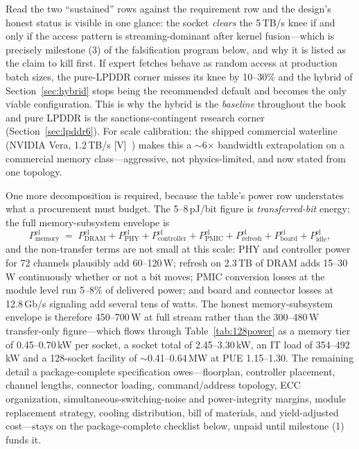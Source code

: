 Read the two ``sustained'' rows against the requirement row and the design's honest status is visible in one glance: the socket \emph{clears} the 5\,TB/s knee if and only if the access pattern is streaming-dominant after kernel fusion---which is precisely milestone (3) of the falsification program below, and why it is listed as the claim to kill first. If expert fetches behave as random access at production batch sizes, the pure-LPDDR corner misses its knee by 10--30\% and the hybrid of Section~\ref{sec:hybrid} stops being the recommended default and becomes the only viable configuration. This is why the hybrid is the \emph{baseline} throughout the book and pure LPDDR is the sanctions-contingent research corner (Section~\ref{sec:lpddr6}). For scale calibration: the shipped commercial waterline (NVIDIA Vera, 1.2\,TB/s [V]~\cite{nvidiaVera}) makes this a $\sim$6$\times$ bandwidth extrapolation on a commercial memory class---aggressive, not physics-limited, and now stated from one topology.

One more decomposition is required, because the table's power row understates what a procurement must budget. The 5--8\,pJ/bit figure is \emph{transferred-bit} energy; the full memory-subsystem envelope is
\[
P^{\mathrm{el}}_{\mathrm{memory}} \;=\; P^{\mathrm{el}}_{\mathrm{DRAM}} + P^{\mathrm{el}}_{\mathrm{PHY}} + P^{\mathrm{el}}_{\mathrm{controller}} + P^{\mathrm{el}}_{\mathrm{PMIC}} + P^{\mathrm{el}}_{\mathrm{refresh}} + P^{\mathrm{el}}_{\mathrm{board}} + P^{\mathrm{el}}_{\mathrm{idle}},
\]
and the non-transfer terms are not small at this scale: PHY and controller power for 72 channels plausibly add 60--120\,W; refresh on 2.3\,TB of DRAM adds 15--30\,W continuously whether or not a bit moves; PMIC conversion losses at the module level run 5--8\% of delivered power; and board and connector losses at 12.8\,Gb/s signaling add several tens of watts. The honest memory-subsystem envelope is therefore 450--700\,W at full stream rather than the 300--480\,W transfer-only figure---which flows through Table~\ref{tab:128power} as a memory tier of 0.45--0.70\,kW per socket, a socket total of 2.45--3.30\,kW, an IT load of 354--492\,kW and a 128-socket facility of $\sim$0.41--0.64\,MW at PUE 1.15--1.30. The remaining detail a package-complete specification owes---floorplan, controller placement, channel lengths, connector loading, command/address topology, ECC organization, simultaneous-switching-noise and power-integrity margins, module replacement strategy, cooling distribution, bill of materials, and yield-adjusted cost---stays on the package-complete checklist below, unpaid until milestone (1) funds it.

